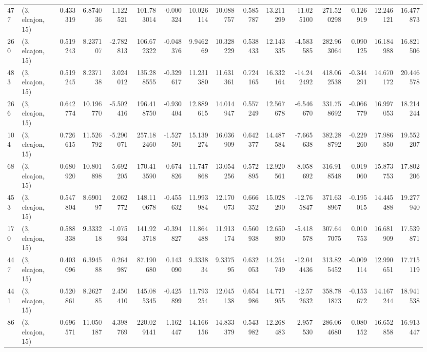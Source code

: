 \begin{tabular}{llrrrrrrrrrrrrrr}
477 &  (3, elcajon, 15) &   0.433319 &   6.874036 &   1.122521 &   101.783014 &  -0.000324 &  10.026114 &  10.088757 &  0.585787 &  13.211299 & -11.025100 &   271.520298 &  0.126919 &  12.246121 &  16.477873 \\
260 &  (3, elcajon, 15) &   0.519243 &   8.237107 &  -2.782813 &   106.672322 &  -0.048376 &   9.946269 &  10.328229 &  0.538433 &  12.143335 &  -4.583585 &   282.963064 &  0.090125 &  16.184988 &  16.821506 \\
483 &  (3, elcajon, 15) &   0.519245 &   8.237138 &   3.024012 &   135.288555 &  -0.329617 &  11.231380 &  11.631361 &  0.724165 &  16.332164 & -14.242492 &   418.062538 & -0.344291 &  14.670172 &  20.446578 \\
266 &  (3, elcajon, 15) &   0.642774 &  10.196770 &  -5.502416 &   196.418750 &  -0.930404 &  12.889615 &  14.014947 &  0.557249 &  12.567678 &  -6.546670 &   331.758692 & -0.066779 &  16.997053 &  18.214244 \\
104 &  (3, elcajon, 15) &   0.726615 &  11.526792 &  -5.290071 &   257.182460 &  -1.527591 &  15.139274 &  16.036909 &  0.642377 &  14.487584 &  -7.665638 &   382.288792 & -0.229260 &  17.986850 &  19.552207 \\
68  &  (3, elcajon, 15) &   0.680920 &  10.801898 &  -5.692205 &   170.413590 &  -0.674826 &  11.747868 &  13.054256 &  0.572895 &  12.920561 &  -8.058692 &   316.918548 & -0.019060 &  15.873753 &  17.802206 \\
453 &  (3, elcajon, 15) &   0.547804 &   8.690197 &   2.062772 &   148.110678 &  -0.455632 &  11.993984 &  12.170073 &  0.666352 &  15.028290 & -12.765847 &   371.638967 & -0.195015 &  14.445488 &  19.277940 \\
170 &  (3, elcajon, 15) &   0.588338 &   9.333218 &  -1.075934 &   141.923718 &  -0.394827 &  11.864488 &  11.913174 &  0.560938 &  12.650890 &  -5.418578 &   307.647075 &  0.010753 &  16.681909 &  17.539871 \\
447 &  (3, elcajon, 15) &   0.403096 &   6.394588 &   0.264987 &    87.190680 &   0.143090 &   9.333834 &   9.337595 &  0.632053 &  14.254749 & -12.044436 &   313.825452 & -0.009114 &  12.990651 &  17.715119 \\
441 &  (3, elcajon, 15) &   0.520861 &   8.262785 &   2.450410 &   145.085345 &  -0.425899 &  11.793254 &  12.045138 &  0.654986 &  14.771955 & -12.572632 &   358.781873 & -0.153672 &  14.167244 &  18.941538 \\
86  &  (3, elcajon, 15) &   0.696571 &  11.050187 &  -4.398769 &   220.029141 &  -1.162447 &  14.166156 &  14.833379 &  0.543982 &  12.268483 &  -2.957530 &   286.064680 &  0.080152 &  16.652858 &  16.913447 \\

\end{tabular}
